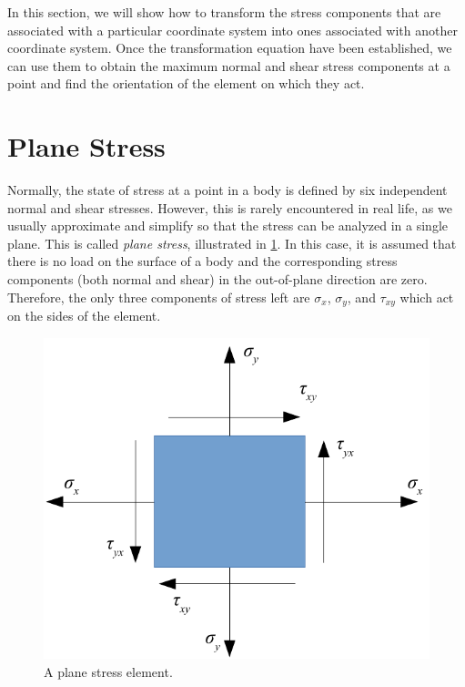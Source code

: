 \documentclass[
10pt,
a4paper,
openany,
svgnames,
]{book} %
\begin{document}
In this section, we will show how to transform the stress components that are associated with a particular coordinate system into ones associated with another coordinate system. Once the transformation equation have been established, we can use them to obtain the maximum normal and shear stress components at a point and find the orientation of the element on which they act.

\section{Plane Stress}

Normally, the state of stress at a point in a body is defined by six independent normal and shear stresses. However, this is rarely encountered in real life, as we usually approximate and simplify so that the stress can be analyzed in a single plane. This is called \emph{plane stress}, illustrated in \cref{fig: plane stress element}. In this case, it is assumed that there is no load on the surface of a body and the corresponding stress components (both normal and shear) in the out-of-plane direction are zero. Therefore, the only three components of stress left are $\sigma_x$, $\sigma_y$, and $\tau_{xy}$ which act on the sides of the element.

\begin{figure}[h]
  \centering
  \includegraphics[scale=0.7]{pictures/Multiaxial/plane-stress}
  \caption{A plane stress element.}
  \label{fig: plane stress element}
\end{figure}
\end{document}

